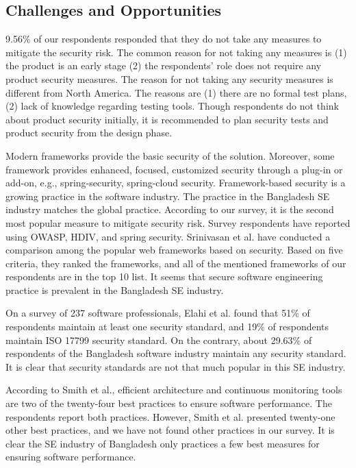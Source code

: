\subsection{Challenges and Opportunities}
\label{dicussion challanges}
9.56\% of our respondents responded that they do not take any measures to mitigate the security risk. The common reason for not taking any measures is (1) the product is an early stage (2) the respondents' role does not require any product security measures. The reason for not taking any security measures is different from North America\citep{Assal2019}. The reasons are (1) there are no formal test plans, (2) lack of knowledge regarding testing tools. Though respondents do not think about product security initially, it is recommended\citep{Chandra2009,Azham2011} to plan security tests and product security from the design phase.

Modern frameworks provide the basic security of the solution. Moreover, some framework provides enhanced, focused, customized security through a plug-in or add-on, e.g., spring-security, spring-cloud security. Framework-based security is a growing practice in the software industry\citep{Alssir2012}. The practice in the Bangladesh SE industry matches the global practice. According to our survey, it is the second most popular measure to mitigate security risk. Survey respondents have reported using OWASP, HDIV, and spring security. Srinivasan et al.\citep{Srinivasan2017} have conducted a comparison among the popular web frameworks based on security. Based on five criteria, they ranked the frameworks, and all of the mentioned frameworks of our respondents are in the top 10 list. It seems that secure software engineering practice is prevalent in the Bangladesh SE industry.


On a survey of 237 software professionals, Elahi et al.\citep{Elahi2011} found that 51\% of respondents maintain at least one security standard, and 19\% of respondents maintain ISO 17799 security standard. On the contrary, about 29.63\% of respondents of the Bangladesh software industry maintain any security standard. It is clear that security standards are not that much popular in this SE industry.

According to Smith et al.\citep{Smith2003}, efficient architecture and continuous monitoring tools are two of the twenty-four best practices to ensure software performance. The respondents report both practices. However, Smith et al. presented twenty-one other best practices, and we have not found other practices in our survey. It is clear the SE industry of Bangladesh only practices a few best measures for ensuring software performance.

